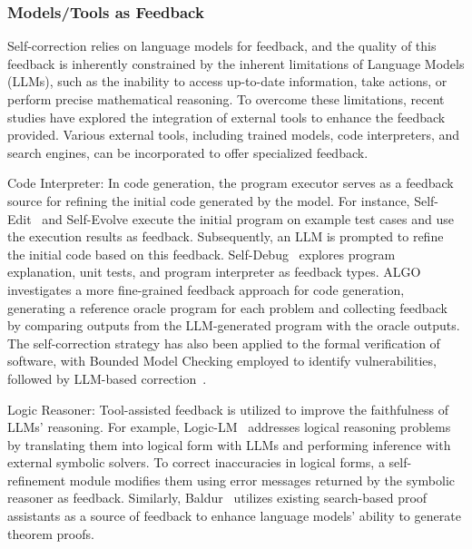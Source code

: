 \documentclass[12pt]{extarticle}
\begin{document}
\subsubsection{Models/Tools as Feedback}
Self-correction relies on language models for feedback, and the quality of this feedback is inherently constrained by the inherent limitations of Language Models (LLMs), such as the inability to access up-to-date information, take actions, or perform precise mathematical reasoning. To overcome these limitations, recent studies have explored the integration of external tools to enhance the feedback provided. Various external tools, including trained models, code interpreters, and search engines, can be incorporated to offer specialized feedback.

Code Interpreter: In code generation, the program executor serves as a feedback source for refining the initial code generated by the model. For instance, Self-Edit~\cite{zhang2023selfedit} and Self-Evolve execute the initial program on example test cases and use the execution results as feedback. Subsequently, an LLM is prompted to refine the initial code based on this feedback. Self-Debug~\cite{chen2023teaching} explores program explanation, unit tests, and program interpreter as feedback types. ALGO~\cite{zhang2023algo} investigates a more fine-grained feedback approach for code generation, generating a reference oracle program for each problem and collecting feedback by comparing outputs from the LLM-generated program with the oracle outputs. The self-correction strategy has also been applied to the formal verification of software, with Bounded Model Checking employed to identify vulnerabilities, followed by LLM-based correction~\cite{charalambous2023new}.

Logic Reasoner: Tool-assisted feedback is utilized to improve the faithfulness of LLMs' reasoning. For example, Logic-LM~\cite{pan2023logiclm} addresses logical reasoning problems by translating them into logical form with LLMs and performing inference with external symbolic solvers. To correct inaccuracies in logical forms, a self-refinement module modifies them using error messages returned by the symbolic reasoner as feedback. Similarly, Baldur~\cite{first2023baldur} utilizes existing search-based proof assistants as a source of feedback to enhance language models' ability to generate theorem proofs.
\end{document}
